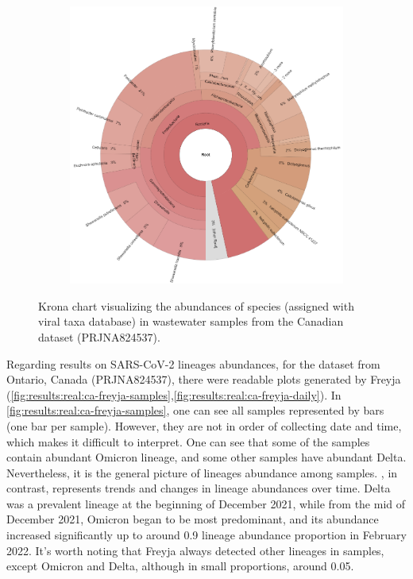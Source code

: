\begin{figure}[ht!]
\begin{subfigure}[b]{0.3\textwidth}
        \label{fig:results:real:krona-ca-b}
        \end{subfigure}
        \hfill
        \begin{subfigure}[b]{0.3\textwidth}
        \includegraphics[width=1\textwidth]{figures/results/real/krona/krona-ca-all.png}
        \label{fig:results:real:krona-ca-c}
        \end{subfigure}
        \caption{Krona chart visualizing the abundances of species (assigned with viral taxa database) in wastewater samples from the Canadian dataset (PRJNA824537).}
    \end{figure}
    
    Regarding results on SARS-CoV-2 lineages abundances, for the dataset from Ontario, Canada (PRJNA824537), there were readable plots generated by Freyja (\cref{fig:results:real:ca-freyja-samples},\ref{fig:results:real:ca-freyja-daily}). In \cref{fig:results:real:ca-freyja-samples}, one can see all samples represented by bars (one bar per sample). However, they are not in order of collecting date and time, which makes it difficult to interpret. One can see that some of the samples contain abundant Omicron lineage, and some other samples have abundant Delta. Nevertheless, it is the general picture of lineages abundance among samples. , in contrast, represents trends and changes in lineage abundances over time. Delta was a prevalent lineage at the beginning of December 2021, while from the mid of December 2021, Omicron began to be most predominant, and its abundance increased significantly up to around 0.9 lineage abundance proportion in February 2022. It's worth noting that Freyja always detected other lineages in samples, except Omicron and Delta, although in small proportions, around 0.05.
    
